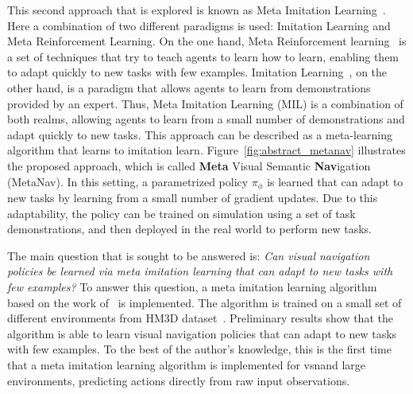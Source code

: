 This second approach that is explored is known as Meta Imitation Learning~\cite{finnOneShotVisualImitation2017}.
Here a combination of two different paradigms is used: Imitation Learning and Meta Reinforcement Learning.
On the one hand, Meta Reinforcement learning~\cite{Beck_2025} is a set of techniques that try to teach agents to learn how to learn, enabling them to adapt quickly to new tasks with few examples.
Imitation Learning~\cite{10602544}, on the other hand, is a paradigm that allows agents to learn from demonstrations provided by an expert.
Thus, Meta Imitation Learning (MIL) is a combination of both realms, allowing agents to learn from a small number of demonstrations and adapt quickly to new tasks.
This approach can be described as a meta-learning algorithm that learns to imitation learn.
Figure~\ref{fig:abstract_metanav} illustrates the proposed approach, which is called \textbf{Meta} Visual Semantic \textbf{Nav}igation (MetaNav).
In this setting, a parametrized policy $\pi_\phi$ is learned that can adapt to new tasks by learning from a small number of gradient updates.
Due to this adaptability, the policy can be trained on simulation using a set of task demonstrations, and then deployed in the real world to perform new tasks.

The main question that is sought to be answered is: \textit{Can visual navigation policies be learned via meta imitation learning that can adapt to new tasks with few examples?}
To answer this question, a meta imitation learning algorithm based on the work of~\cite{finnOneShotVisualImitation2017} is implemented.
The algorithm is trained on a small set of different environments from HM3D dataset~\cite{Ramakrishnan2021HabitatMatterport3D}.
Preliminary results show that the algorithm is able to learn visual navigation policies that can adapt to new tasks with few examples.
To the best of the author's knowledge, this is the first time that a meta imitation learning algorithm is implemented for \acrshort{vsn}\@ and large environments, predicting actions directly from raw input observations.

